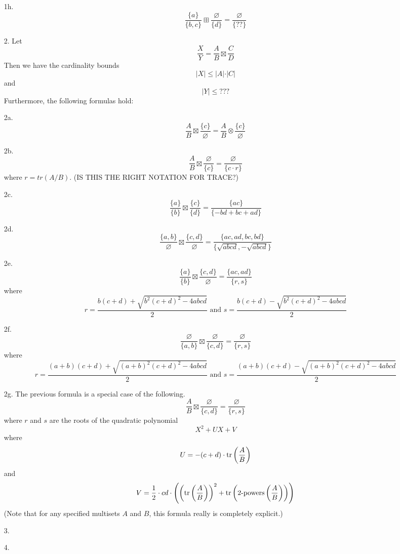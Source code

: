 \begin{theorem}
\begin{itemize}
\item[1h.] $$\frac{ \{a \}  }{\{ b,c \} } \boxplus \frac{\varnothing}{ \{  d \} } = \frac{ \varnothing  }{ \{ ?? \} }$$


\item[2.] Let $$\frac{X}{Y} = \frac{A}{B} \boxtimes \frac{C}{D}$$
Then we have the cardinality bounds
$$ \vert X \vert \leq \vert A \vert \cdot \vert C \vert   $$ 
and 
$$  \vert Y \vert \leq ???  $$
Furthermore, the following formulas hold:

\item[2a.] $$\frac{ A }{ B } \boxtimes \frac{\{ c \}}{ \varnothing }=\frac{A }{ B } \otimes \frac{\{ c \}}{ \varnothing }$$

\item[2b.] $$\frac{A }{ B } \boxtimes \frac{ \varnothing }{\{ c \}} = \frac{\varnothing}{\{c \cdot r\}}$$
where $r = tr(A/B)$. (IS THIS THE RIGHT NOTATION FOR TRACE?)

\item[2c.] $$\frac{\{a\}}{\{b\}} \boxtimes \frac{\{c\}}{\{d\}} = \frac{\{ac\}}{\{-bd+bc+ad\}}$$

\item[2d.] $$\frac{\{a,b\}}{\varnothing} \boxtimes \frac{\{c,d\}}{\varnothing} = \frac{\{ac,ad,bc,bd\}}{\{\sqrt{abcd}, -\sqrt{abcd}\}}$$


\item[2e.] $$\frac{\{a\}}{\{b\}} \boxtimes \frac{\{c,d\}}{\varnothing} = \frac{\{ac,ad\}}{\{r, s\}}$$
where 
$$r = \frac{b(c+d) + \sqrt{b^2 (c+d)^2 - 4abcd}}{2} \text{\ and\ } s = \frac{b(c+d) - \sqrt{b^2 (c+d)^2 - 4abcd}}{2}$$


\item[2f.] $$\frac{\varnothing}{\{a, b\}} \boxtimes \frac{\varnothing}{\{c,d\}} = \frac{\varnothing}{\{r, s\}}$$
where 
$$r = \frac{(a+b)(c+d) + \sqrt{(a+b)^2 (c+d)^2 - 4abcd}}{2} \text{\ and\ } s = \frac{(a+b)(c+d) - \sqrt{(a+b)^2 (c+d)^2 - 4abcd}}{2}$$

\item[2g.] The previous formula is a special case of the following.
$$\frac{A}{B} \boxtimes \frac{\varnothing}{\{c,d\}} = \frac{\varnothing}{\{r, s\}}$$
where $r$ and $s$ are the roots of the quadratic polynomial
$$ X^2 + UX + V   $$   
where
$$ U = -(c+d) \cdot \mathrm{tr} \left( \frac{A}{B}  \right)   $$
and
$$ V = \frac{1}{2}\cdot cd \cdot \left (  \left( \mathrm{tr} \left( \frac{A}{B}  \right) \right)^2    + \mathrm{tr} \left(   {2}\text{-powers} \left(  \frac{A}{B}  \right)   \right)   \right) $$
(Note that for any specified multisets $A$ and $B$, this formula really is completely explicit.)

\item[3.] 



\item[4.] 

\end{itemize}



\end{theorem}



